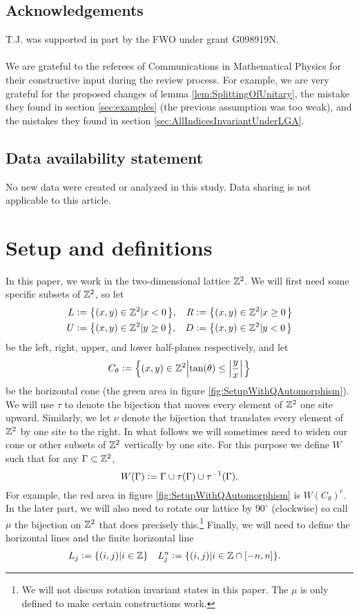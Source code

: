\documentclass[11pt,a4paper,twoside]{article}
\numberwithin{equation}{section}
\begin{document}
	\subsection*{Acknowledgements}
	T.J. was supported in part by the FWO under grant G098919N.\\\\
	We are grateful to the referees of Communications in Mathematical Physics for their constructive input during the review process. For example, we are very grateful for the proposed changes of lemma \ref{lem:SplittingOfUnitary}, the mistake they found in section \ref{sec:examples} (the previous assumption was too weak), and the mistakes they found in section \ref{sec:AllIndicesInvariantUnderLGA}.
	\subsection*{Data availability statement}
	No new data were created or analyzed in this study. Data sharing is not applicable to this article.
	\section{Setup and definitions}\label{sec:Setup}
	In this paper, we work in the two-dimensional lattice $\mathbb Z^2$. We will first need some specific subsets of $\mathbb Z^2$, so let
	\begin{align}
		L&\defeq \left\{(x,y)\in\ZZ^2\left|x<0\right.\right\},&R&\defeq \left\{(x,y)\in\ZZ^2\left|x\geq 0\right.\right\}\\
		U&\defeq \left\{(x,y)\in\ZZ^2\left|y\geq 0\right.\right\},&D&\defeq \left\{(x,y)\in\ZZ^2\left|y<0\right.\right\}
	\end{align}
	be the left, right, upper, and lower half-planes respectively, and let
	\begin{equation}
		C_\theta\defeq \left\{(x,y)\in\ZZ^2\left|\tan(\theta)\leq\abs{\frac{y}{x}}\right.\right\}
	\end{equation}
	be the horizontal cone (the green area in figure \ref{fig:SetupWithQAutomorphism}). We will use $\tau$ to denote the bijection that moves every element of $\mathbb Z^2$ one site upward. Similarly, we let $\nu$ denote the bijection that translates every element of $\mathbb Z^2$ by one site to the right. In what follows we will sometimes need to widen our cone or other subsets of $\mathbb Z^2$ vertically by one site. For this purpose we define $W$ such that for any $\Gamma\subset\mathbb Z^2$,
	\begin{equation}
		W(\Gamma)\vcentcolon= \Gamma\cup\tau(\Gamma)\cup\tau^{-1}(\Gamma).
	\end{equation}
	For example, the red area in figure \ref{fig:SetupWithQAutomorphism} is $W(C_\theta)^c$. In the later part, we will also need to rotate our lattice by $90^\circ$ (clockwise) so call $\mu$ the bijection on $\mathbb Z^2$ that does precisely this.\footnote{We will not discuss rotation invariant states in this paper. The $\mu$ is only defined to make certain constructions work.} Finally, we will need to define the horizontal lines and the finite horizontal line
	\begin{align}
		L_j&\vcentcolon= \{(i,j)|i\in\mathbb Z\}&L_j^n&\vcentcolon= \{(i,j)|i\in\mathbb Z\cap[-n,n]\}.
	\end{align}
\end{document}
